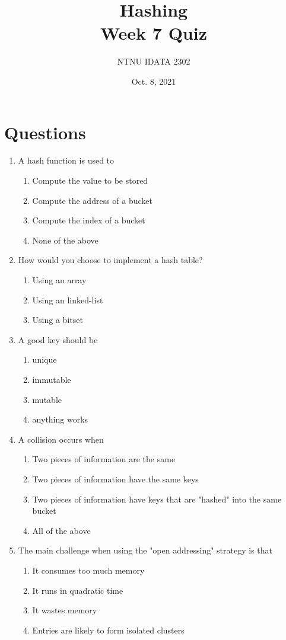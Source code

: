 \documentclass[11pt]{article}
\author{NTNU IDATA 2302}
\date{Oct. 8, 2021}
\title{Hashing\\\medskip
\large Week 7 Quiz}
\begin{document}
\maketitle


\section{Questions}
\label{sec:orgb295c70}

\begin{enumerate}
\item A hash function is used to
\begin{enumerate}
\item Compute the value to be stored
\item Compute the address of a bucket
\item Compute the index of a bucket
\item None of the above
\end{enumerate}

\item How would you choose to implement a hash table?
\begin{enumerate}
\item Using an array
\item Using an linked-list
\item Using a bitset
\end{enumerate}

\item A good key should be
\begin{enumerate}
\item unique
\item immutable
\item mutable
\item anything works
\end{enumerate}

\item A collision occurs when
\begin{enumerate}
\item Two pieces of information are the same
\item Two pieces of information have the same keys
\item Two pieces of information have keys that are "hashed" into the same bucket
\item All of the above
\end{enumerate}

\item The main challenge when using the "open addressing" strategy is that
\begin{enumerate}
\item It consumes too much memory
\item It runs in quadratic time
\item It wastes memory
\item Entries are likely to form isolated clusters
\end{enumerate}


\end{enumerate}
\end{document}
